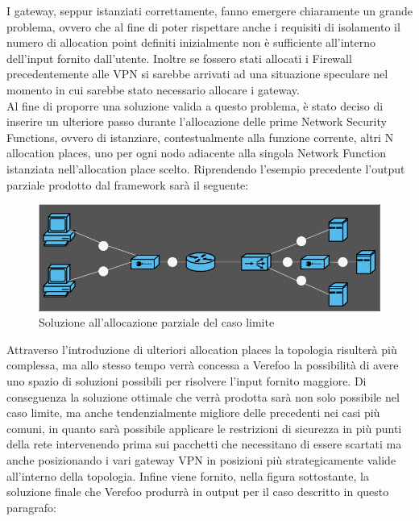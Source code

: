 I gateway, seppur istanziati correttamente, fanno emergere chiaramente un grande problema, ovvero che al fine di poter rispettare anche i requisiti di
isolamento il numero di allocation point definiti inizialmente non è sufficiente all'interno dell'input fornito dall'utente. Inoltre se fossero stati allocati
i Firewall precedentemente alle VPN si sarebbe arrivati ad una situazione speculare nel momento in cui sarebbe stato necessario allocare i gateway.\\
Al fine di proporre una soluzione valida a questo problema, è stato deciso di inserire un ulteriore passo durante l'allocazione delle prime Network Security Functions,
ovvero di istanziare, contestualmente alla funzione corrente, altri N allocation places, uno per ogni nodo adiacente alla singola Network Function istanziata nell'allocation place 
scelto. Riprendendo l'esempio precedente l'output parziale prodotto dal framework sarà il seguente:


\begin{figure}[h]  %
    \centering
    \includegraphics[width=1\textwidth]{CasoLimite3.png}  %
    \caption{Soluzione all'allocazione parziale del caso limite}
    \label{fig:CasoLimite3}
\end{figure}
Attraverso l'introduzione di ulteriori allocation places la topologia risulterà più complessa, ma allo stesso tempo verrà concessa a Verefoo la possibilità di avere uno spazio di soluzioni
possibili per risolvere l'input fornito maggiore. Di conseguenza la soluzione ottimale che verrà prodotta sarà non solo possibile nel caso limite, ma anche tendenzialmente migliore delle precedenti
nei casi più comuni, in quanto sarà possibile applicare le restrizioni di sicurezza in più punti della rete intervenendo prima sui pacchetti che necessitano di essere scartati ma anche posizionando 
i vari gateway VPN in posizioni più strategicamente valide all'interno della topologia. Infine viene fornito, nella figura sottostante, la soluzione finale che Verefoo produrrà in output per il caso
descritto in questo paragrafo:

